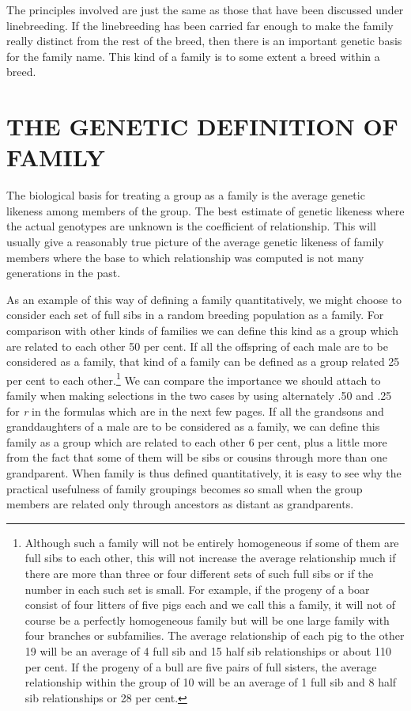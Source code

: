 The principles involved are just the same as those that have been
discussed under linebreeding. If the linebreeding has been carried far
enough to make the family really distinct from the rest of the breed,
then there is an important genetic basis for the family name. This kind
of a family is to some extent a breed within a breed.

\section*{THE GENETIC DEFINITION OF FAMILY}

The biological basis for treating a group as a family is the average
genetic likeness among members of the group. The best estimate of
genetic likeness where the actual genotypes are unknown is the coefficient
of relationship. This will usually give a reasonably true picture of
the average genetic likeness of family members where the base to which
relationship was computed is not many generations in the past.

As an example of this way of defining a family quantitatively, we
might choose to consider each set of full sibs in a random breeding
population as a family. For comparison with other kinds of families
we can define this kind as a group which are related to each other 50
per cent. If all the offspring of each male are to be considered as a family,
that kind of a family can be defined as a group related 25 per cent to
each other.\footnote{Although such a family will not be entirely homogeneous
if some of them are full sibs to each other, this will not increase the average
relationship much if there are more than three or four different sets of such
full sibs or if the number in each such set is small. For example, if the
progeny of a boar consist of four litters of five pigs each and we call this a
family, it will not of course be a perfectly homogeneous family but will be
one large family with four branches or subfamilies. The average relationship
of each pig to the other 19 will be an average of 4 full sib and 15 half sib
relationships or about 110 per cent. If the progeny of a bull are five pairs
of full sisters, the average relationship within the group of 10 will be an
average of 1 full sib and 8 half sib relationships or 28 per cent.} We can
compare the importance we should attach to family when making selections in
the two cases by using alternately .50 and .25 for \textit{r} in the formulas
which are in the next few pages. If all the grandsons and granddaughters of
a male are to be considered as a family, we can define this family as a group
which are related to each other 6 per cent, plus a little
more from the fact that some of them will be sibs or cousins through more
than one grandparent. When family is thus defined quantitatively, it is easy
to see why the practical usefulness of family groupings becomes so small
when the group members are related only through ancestors as distant as
grandparents.

